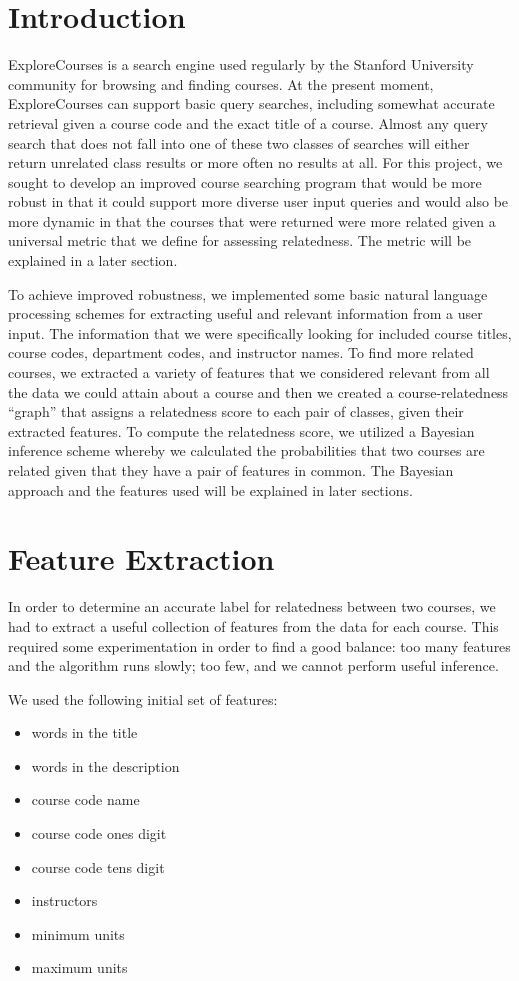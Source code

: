 \documentclass[12pt]{article}
\begin{document}
\section*{Introduction}
ExploreCourses is a search engine used regularly by the Stanford
University community for browsing and finding courses. At the present
moment, ExploreCourses can support basic query searches, including
somewhat accurate retrieval given a course code and the exact title of
a course. Almost any query search that does not fall into one of these
two classes of searches will either return unrelated class results or
more often no results at all. For this project, we sought to develop
an improved course searching program that would be more robust in that
it could support more diverse user input queries and would also be
more dynamic in that the courses that were returned were more related
given a universal metric that we define for assessing relatedness. The
metric will be explained in a later section.

To achieve improved robustness, we implemented some basic natural
language processing schemes for extracting useful and relevant
information from a user input. The information that we were
specifically looking for included course titles, course codes,
department codes, and instructor names. To find more related courses,
we extracted a variety of features that we considered relevant from
all the data we could attain about a course and then we created a
course-relatedness ``graph'' that assigns a relatedness score to each
pair of classes, given their extracted features. To compute the
relatedness score, we utilized a Bayesian inference scheme whereby we
calculated the probabilities that two courses are related given that
they have a pair of features in common. The Bayesian approach and the
features used will be explained in later sections.

\section*{Feature Extraction}
In order to determine an accurate label for relatedness
between two courses, we had to extract a useful collection of
features from the data for each course. This required some
experimentation in order to find a good balance: too many features and
the algorithm runs slowly; too few, and we cannot perform useful
inference.

We used the following initial set of features: 

\begin{itemize}
\item words in the title
\item words in the description
\item course code name
\item course code ones digit
\item course code tens digit
\item instructors
\item minimum units
\item maximum units
\end{itemize}
\end{document}
